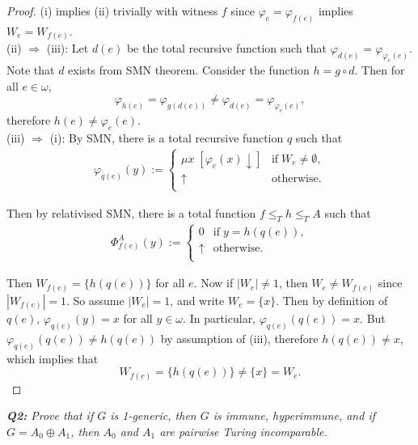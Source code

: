 \documentclass{article}
\begin{document}
  \begin{proof}
    (i) implies (ii) trivially with witness $f$ since
    $\varphi_e=\varphi_{f(e)}$ implies $W_e=W_{f(e)}$. \\

    (ii) $\Rightarrow$ (iii): Let $d(e)$ be the total recursive function
    such that $\varphi_{d(e)} =\varphi_{\varphi_e(e)}$. Note that $d$
    exists from SMN theorem. Consider the function $h=g\circ d$. Then for
    all $e\in\omega$,
    \[\varphi_{h(e)} =\varphi_{g(d(e))} \neq\varphi_{d(e)}
    =\varphi_{\varphi_e(e)},\]
    therefore $h(e)\neq\varphi_e(e)$. \\

    (iii) $\Rightarrow$ (i): By SMN, there is a total recursive function
    $q$ such that
    \begin{align*}
      \varphi_{q(e)}(y) :=
      \begin{cases}
        \mu x\; [\varphi_e(x)\downarrow] &\text{if}\; W_e\neq\emptyset,\\
        \uparrow &\text{otherwise}.\\
      \end{cases}
    \end{align*}

    Then by relativised SMN, there is a total function $f\leq_Th\leq_TA$
    such that
    \begin{align*}
      \Phi_{f(e)}^A(y) :=
      \begin{cases}
        0 &\text{if}\; y=h(q(e)),\\
        \uparrow &\text{otherwise}.\\
      \end{cases}
    \end{align*}

    Then $W_{f(e)}=\{h(q(e))\}$ for all $e$. Now if $|W_e|\neq 1$, then
    $W_e\neq W_{f(e)}$ since $|W_{f(e)}|=1$. So assume $|W_e|=1$, and write
    $W_e=\{x\}$. Then by definition of $q(e)$, $\varphi_{q(e)}(y) =x$ for
    all $y\in\omega$. In particular, $\varphi_{q(e)}(q(e)) =x$. But
    $\varphi_{q(e)}(q(e))\neq h(q(e))$ by assumption of (iii), therefore
    $h(q(e))\neq x$, which implies that
    \[W_{f(e)}=\{h(q(e))\}\neq \{x\}=W_e.\]
  \end{proof}

\it \textbf{Q2:} Prove that if $G$ is 1-generic, then $G$ is immune,
  hyperimmune, and if $G=A_0\oplus A_1$, then $A_0$ and $A_1$ are pairwise
  Turing incomparable.
\end{document}
